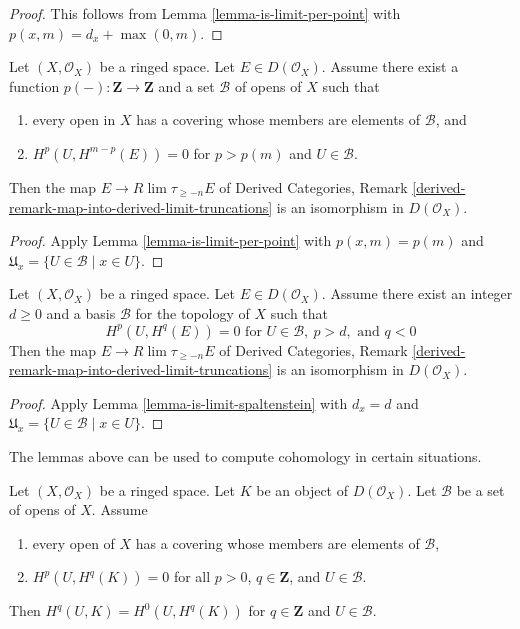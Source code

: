 \begin{proof}
This follows from Lemma \ref{lemma-is-limit-per-point}
with $p(x, m) = d_x + \max(0, m)$.
\end{proof}

\begin{lemma}
\label{lemma-is-limit}
Let $(X, \mathcal{O}_X)$ be a ringed space. Let $E \in D(\mathcal{O}_X)$.
Assume there exist a function $p(-) : \mathbf{Z} \to \mathbf{Z}$
and a set $\mathcal{B}$ of opens of $X$ such that
\begin{enumerate}
\item every open in $X$ has a covering whose members are
elements of $\mathcal{B}$, and
\item $H^p(U, H^{m - p}(E)) = 0$ for $p > p(m)$ and $U \in \mathcal{B}$.
\end{enumerate}
Then the map $E \to R\lim \tau_{\geq -n} E$ of
Derived Categories, Remark
\ref{derived-remark-map-into-derived-limit-truncations}
is an isomorphism in $D(\mathcal{O}_X)$.
\end{lemma}

\begin{proof}
Apply Lemma \ref{lemma-is-limit-per-point}
with $p(x, m) = p(m)$ and
$\mathfrak{U}_x = \{U \in \mathcal{B} \mid x \in U\}$.
\end{proof}

\begin{lemma}
\label{lemma-is-limit-dimension}
Let $(X, \mathcal{O}_X)$ be a ringed space. Let $E \in D(\mathcal{O}_X)$.
Assume there exist an integer $d \geq 0$ and a basis $\mathcal{B}$ for the
topology of $X$ such that
$$
H^p(U, H^q(E)) = 0 \text{ for }
U \in \mathcal{B},\ p > d, \text{ and }q < 0
$$
Then the map $E \to R\lim \tau_{\geq -n} E$ of
Derived Categories, Remark
\ref{derived-remark-map-into-derived-limit-truncations}
is an isomorphism in $D(\mathcal{O}_X)$.
\end{lemma}

\begin{proof}
Apply Lemma \ref{lemma-is-limit-spaltenstein} with $d_x = d$
and $\mathfrak{U}_x = \{U \in \mathcal{B} \mid x \in U\}$.
\end{proof}

\noindent
The lemmas above can be used to compute cohomology
in certain situations.

\begin{lemma}
\label{lemma-cohomology-over-U-trivial}
Let $(X, \mathcal{O}_X)$ be a ringed space. Let $K$
be an object of $D(\mathcal{O}_X)$.
Let $\mathcal{B}$ be a set of opens of $X$. Assume
\begin{enumerate}
\item every open of $X$ has a covering whose members are
elements of $\mathcal{B}$,
\item $H^p(U, H^q(K)) = 0$ for all $p > 0$, $q \in \mathbf{Z}$, and
$U \in \mathcal{B}$.
\end{enumerate}
Then $H^q(U, K) = H^0(U, H^q(K))$ for $q \in \mathbf{Z}$
and $U \in \mathcal{B}$.
\end{lemma}

